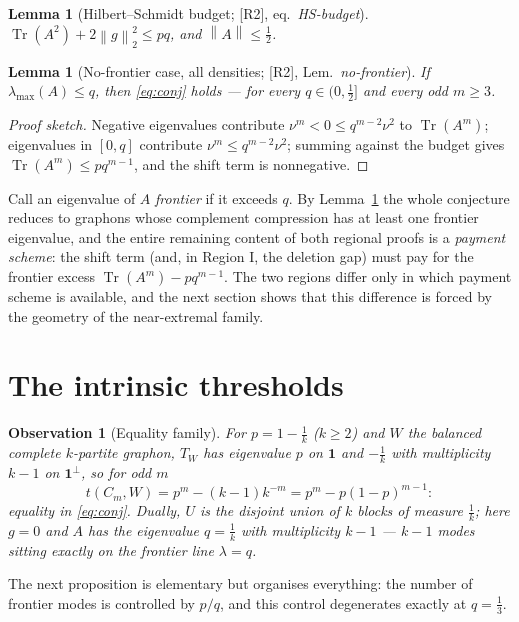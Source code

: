 \documentclass[11pt]{article}
\newtheorem{lemma}[theorem]{Lemma}
\newtheorem{observation}[theorem]{Observation}
\theoremstyle{remark}
\theoremstyle{plain}
\theoremstyle{plain}
\newcommand{\one}{\mathbf 1}
\DeclareMathOperator{\Tr}{Tr}
\newcommand{\norm}[1]{\left\|#1\right\|}
\begin{document}
\begin{lemma}[Hilbert--Schmidt budget; {[R2]}, eq.~\emph{HS-budget}]\label{lem:budget}
$\Tr(A^2)+2\norm g_2^2\le pq$, and $\norm A\le\tfrac12$.
\end{lemma}

\begin{lemma}[No-frontier case, all densities; {[R2]}, Lem.~\emph{no-frontier}]\label{lem:no-frontier}
If $\lambda_{\max}(A)\le q$, then \eqref{eq:conj} holds --- for every
$q\in(0,\tfrac12]$ and every odd $m\ge3$.
\end{lemma}

\begin{proof}[Proof sketch]
Negative eigenvalues contribute $\nu^m<0\le q^{m-2}\nu^2$ to $\Tr(A^m)$;
eigenvalues in $[0,q]$ contribute $\nu^m\le q^{m-2}\nu^2$; summing against
the budget gives $\Tr(A^m)\le pq^{m-1}$, and the shift term is
nonnegative.
\end{proof}

Call an eigenvalue of $A$ \emph{frontier} if it exceeds $q$.  By
Lemma~\ref{lem:no-frontier} the whole conjecture reduces to graphons whose
complement compression has at least one frontier eigenvalue, and the
entire remaining content of both regional proofs is a \emph{payment
scheme}: the shift term (and, in Region I, the deletion gap) must pay for
the frontier excess $\Tr(A^m)-pq^{m-1}$.  The two regions differ only in
which payment scheme is available, and the next section shows that this
difference is forced by the geometry of the near-extremal family.

\section{The intrinsic thresholds}\label{sec:dichotomy}

\begin{observation}[Equality family]\label{obs:equality}
For $p=1-\tfrac1k$ ($k\ge2$) and $W$ the balanced complete $k$-partite
graphon, $T_W$ has eigenvalue $p$ on $\one$ and $-\tfrac1k$ with
multiplicity $k-1$ on $\one^\perp$, so for odd $m$
\[
        t(C_m,W)=p^m-(k-1)k^{-m}=p^m-p(1-p)^{m-1}:
\]
equality in \eqref{eq:conj}.  Dually, $U$ is the disjoint union of $k$
blocks of measure $\tfrac1k$; here $g=0$ and $A$ has the eigenvalue
$q=\tfrac1k$ with multiplicity $k-1$ --- $k-1$ modes sitting exactly
\emph{on} the frontier line $\lambda=q$.
\end{observation}

The next proposition is elementary but organises everything: the number
of frontier modes is controlled by $p/q$, and this control degenerates
exactly at $q=\tfrac13$.
\end{document}
